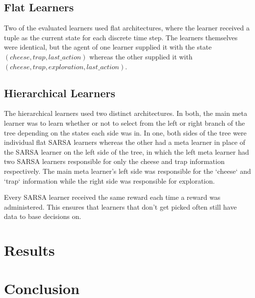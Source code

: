 \documentclass{article}
\begin{document}
	\subsection{Flat Learners}
	Two of the evaluated learners used flat architectures, where the learner received a tuple as the current state for each discrete time step. The learners themselves were identical, but the agent of one learner supplied it with the state $(cheese, trap, last\_action)$ whereas the other supplied it with $(cheese, trap, exploration, last\_action)$. 

	\subsection{Hierarchical Learners}
	The hierarchical learners used two distinct architectures. In both, the main meta learner was to learn whether or not to select from the left or right branch of the tree depending on the states each side was in. In one, both sides of the tree were individual flat SARSA learners whereas the other had a meta learner in place of the SARSA learner on the left side of the tree, in which the left meta learner had two SARSA learners responsible for only the cheese and trap information respectively.
	The main meta learner's left side was responsible for the `cheese` and `trap` information while the right side was responsible for exploration. 

	Every SARSA learner received the same reward each time a reward was administered. This ensures that learners that don't get picked often still have data to base decisions on.

	\section{Results}

	\section{Conclusion}


\newpage


\newpage
\begin{appendices}


\end{appendices}
\end{document}

